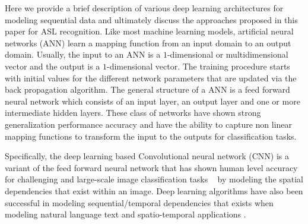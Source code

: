 \documentclass[10pt,twocolumn,letterpaper]{article}
\begin{document}
Here we provide a brief description of various 
deep learning architectures for modeling sequential data and ultimately discuss 
the approaches proposed in this paper for ASL recognition. 
%
Like most  machine learning models,  artificial neural networks (ANN)
learn a mapping function from an input domain to an 
output domain. Usually, the 
input to an ANN is a $1$-dimensional 
or multidimensional vector and the 
output is a $1$-dimensional 
vector. The training procedure starts 
with initial values for the different 
network parameters that are updated via the 
back propagation algorithm. 
The general structure of a ANN is 
a feed forward neural network which consists of an input layer, an output layer and one or more intermediate hidden layers.  These class of 
networks have shown 
strong generalization 
performance accuracy and have the ability to capture 
non linear mapping functions to transform the input to the outputs for classification tasks. 


Specifically, the deep learning based 
Convolutional neural network (CNN)  is  a  variant of the 
feed forward neural network that 
has shown human level accuracy for challenging and large-scale 
image classification tasks ~\cite{NIPS2012_4824} by modeling the spatial dependencies that exist within an image. Deep 
learning algorithms have also been successful in modeling sequential/temporal 
dependencies that exists when modeling natural language text \cite{XXXX,XXX,XXX} and spatio-temporal applications \cite{xx}. 
\end{document}
